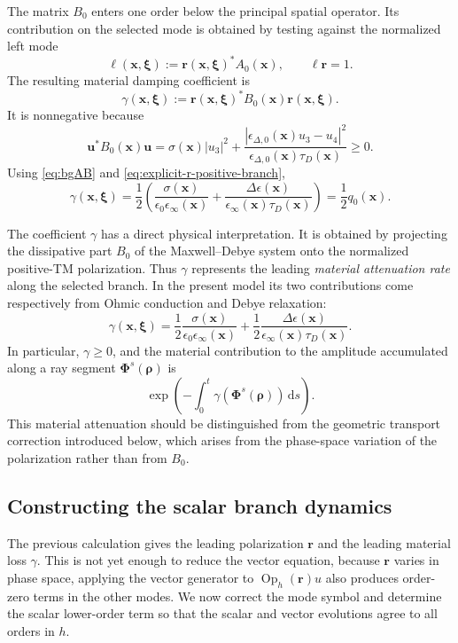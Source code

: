 \documentclass[11pt,reqno]{amsart}
\newcommand{\dd}{\,\mathrm{d}}
\newcommand{\Op}{\operatorname{Op}}
\numberwithin{equation}{section}
\begin{document}
The matrix $B_0$ enters one order below the principal spatial operator. Its contribution on the selected mode is obtained by testing against the normalized left mode
\begin{equation*}
    \bm\ell(\bm x,\bm\xi):=\bm r(\bm x,\bm\xi)^*A_0(\bm x),
    \qquad
    \bm\ell\bm r=1.
\end{equation*}
The resulting material damping coefficient is
\begin{equation*}
    \gamma(\bm x,\bm\xi):=\bm r(\bm x,\bm\xi)^*B_0(\bm x)\bm r(\bm x,\bm\xi).
\end{equation*}
It is nonnegative because
\begin{equation*}
    \bm u^*B_0(\bm x)\bm u=\sigma(\bm x)|u_3|^2+\frac{|\epsilon_{\Delta,0}(\bm x)u_3-u_4|^2}{\epsilon_{\Delta,0}(\bm x)\tau_D(\bm x)}\ge0.
\end{equation*}
Using \eqref{eq:bgAB} and \eqref{eq:explicit-r-positive-branch},
\begin{equation*}
    \gamma(\bm x,\bm\xi)=\frac12\left(\frac{\sigma(\bm x)}{\epsilon_0\epsilon_\infty(\bm x)}+\frac{\Delta\epsilon(\bm x)}{\epsilon_\infty(\bm x)\tau_D(\bm x)}\right)
    =\frac12q_0(\bm x).
\end{equation*}

The coefficient $\gamma$ has a direct physical interpretation. It is obtained by projecting the dissipative part $B_0$ of the Maxwell--Debye system onto the normalized positive-TM polarization. Thus $\gamma$ represents the leading \emph{material attenuation rate} along the selected branch. In the present model its two contributions come respectively from Ohmic conduction and Debye relaxation:
$$
    \gamma(\bm x,\bm\xi)=\frac12\frac{\sigma(\bm x)}{\epsilon_0\epsilon_\infty(\bm x)}+\frac12\frac{\Delta\epsilon(\bm x)}{\epsilon_\infty(\bm x)\tau_D(\bm x)}.
$$
In particular, $\gamma\ge0$, and the material contribution to the amplitude accumulated along a ray segment $\bm\Phi^s(\bm\rho)$ is
$$
    \exp\left(-\int_0^t\gamma(\bm\Phi^s(\bm\rho))\dd s\right).
$$
This material attenuation should be distinguished from the geometric transport correction introduced below, which arises from the phase-space variation of the polarization rather than from $B_0$.

\subsection{Constructing the scalar branch dynamics}

The previous calculation gives the leading polarization $\bm r$ and the leading material loss $\gamma$. This is not yet enough to reduce the vector equation, because $\bm r$ varies in phase space, applying the vector generator to $\Op_h(\bm r)u$ also produces order-zero terms in the other modes. We now correct the mode symbol and determine the scalar lower-order term so that the scalar and vector evolutions agree to all orders in $h$.
\end{document}
